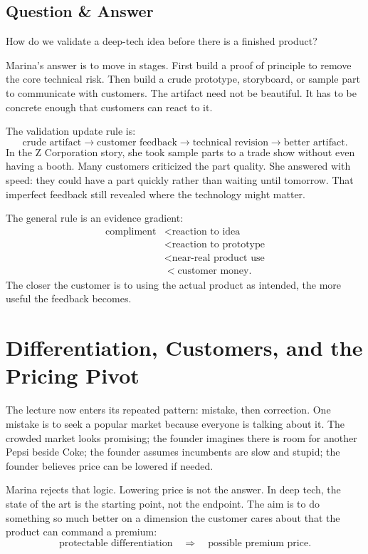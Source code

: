 \subsection{Question \& Answer}

How do we validate a deep-tech idea before there is a finished product?

Marina's answer is to move in stages. First build a proof of principle to remove the core technical risk. Then build a crude prototype, storyboard, or sample part to communicate with customers. The artifact need not be beautiful. It has to be concrete enough that customers can react to it.

The validation update rule is:
\begin{equation}
\text{crude artifact}
\longrightarrow
\text{customer feedback}
\longrightarrow
\text{technical revision}
\longrightarrow
\text{better artifact}.
\end{equation}
In the Z Corporation story, she took sample parts to a trade show without even having a booth. Many customers criticized the part quality. She answered with speed: they could have a part quickly rather than waiting until tomorrow. That imperfect feedback still revealed where the technology might matter.

The general rule is an evidence gradient:
\begin{align}
\text{compliment} &< \text{reaction to idea} \\
&< \text{reaction to prototype} \\
&< \text{near-real product use} \\
&< \text{customer money}.
\end{align}
The closer the customer is to using the actual product as intended, the more useful the feedback becomes.

\section{Differentiation, Customers, and the Pricing Pivot}

The lecture now enters its repeated pattern: mistake, then correction. One mistake is to seek a popular market because everyone is talking about it. The crowded market looks promising; the founder imagines there is room for another Pepsi beside Coke; the founder assumes incumbents are slow and stupid; the founder believes price can be lowered if needed.

Marina rejects that logic. Lowering price is not the answer. In deep tech, the state of the art is the starting point, not the endpoint. The aim is to do something so much better on a dimension the customer cares about that the product can command a premium:
\begin{equation}
\text{protectable differentiation}
\quad\Rightarrow\quad
\text{possible premium price}.
\end{equation}

